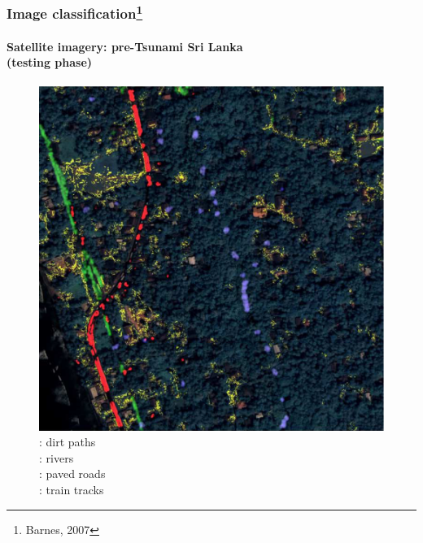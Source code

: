 \begin{frame}
\frametitle{Image classification\footnote{Barnes, 2007}}
\framesubtitle{\small Satellite imagery: pre-Tsunami Sri Lanka\\(testing phase)}
\logoCSIPCPL\mypagenum
	\begin{figure}		
		\includegraphics[height=0.5\textheight]{thesis/RVQ_SatelliteSriLanka_3_labeling.png}
		\caption{: dirt paths \\: rivers \\: paved roads \\: train tracks}
	\end{figure}
\end{frame}


